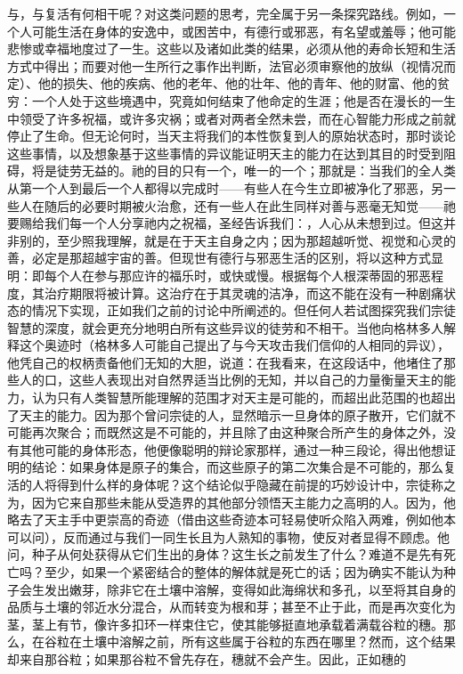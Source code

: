与，与复活有何相干呢？对这类问题的思考，完全属于另一条探究路线。例如，一个人可能生活在身体的安逸中，或困苦中，有德行或邪恶，有名望或羞辱；他可能悲惨或幸福地度过了一生。这些以及诸如此类的结果，必须从他的寿命长短和生活方式中得出；而要对他一生所行之事作出判断，法官必须审察他的放纵（视情况而定）、他的损失、他的疾病、他的老年、他的壮年、他的青年、他的财富、他的贫穷：一个人处于这些境遇中，究竟如何结束了他命定的生涯；他是否在漫长的一生中领受了许多祝福，或许多灾祸；或者对两者全然未尝，而在心智能力形成之前就停止了生命。但无论何时，当天主将我们的本性恢复到人的原始状态时，那时谈论这些事情，以及想象基于这些事情的异议能证明天主的能力在达到其目的时受到阻碍，将是徒劳无益的。祂的目的只有一个，唯一的一个；那就是：当我们的全人类从第一个人到最后一个人都得以完成时——有些人在今生立即被净化了邪恶，另一些人在随后的必要时期被火治愈，还有一些人在此生同样对善与恶毫无知觉——祂要赐给我们每一个人分享祂内之祝福，圣经告诉我们：，人心从未想到过。但这并非别的，至少照我理解，就是在于天主自身之内；因为那超越听觉、视觉和心灵的善，必定是那超越宇宙的善。但现世有德行与邪恶生活的区别，将以这种方式显明：即每个人在参与那应许的福乐时，或快或慢。根据每个人根深蒂固的邪恶程度，其治疗期限将被计算。这治疗在于其灵魂的洁净，而这不能在没有一种剧痛状态的情况下实现，正如我们之前的讨论中所阐述的。但任何人若试图探究我们宗徒智慧的深度，就会更充分地明白所有这些异议的徒劳和不相干。当他向格林多人解释这个奥迹时（格林多人可能自己提出了与今天攻击我们信仰的人相同的异议），他凭自己的权柄责备他们无知的大胆，说道：在我看来，在这段话中，他堵住了那些人的口，这些人表现出对自然界适当比例的无知，并以自己的力量衡量天主的能力，认为只有人类智慧所能理解的范围才对天主是可能的，而超出此范围的也超出了天主的能力。因为那个曾问宗徒的人，显然暗示一旦身体的原子散开，它们就不可能再次聚合；而既然这是不可能的，并且除了由这种聚合所产生的身体之外，没有其他可能的身体形态，他便像聪明的辩论家那样，通过一种三段论，得出他想证明的结论：如果身体是原子的集合，而这些原子的第二次集合是不可能的，那么复活的人将得到什么样的身体呢？这个结论似乎隐藏在前提的巧妙设计中，宗徒称之为，因为它来自那些未能从受造界的其他部分领悟天主能力之高明的人。因为，他略去了天主手中更崇高的奇迹（借由这些奇迹本可轻易使听众陷入两难，例如他本可以问），反而通过与我们一同生长且为人熟知的事物，使反对者显得不顾虑。他问，种子从何处获得从它们生出的身体？这生长之前发生了什么？难道不是先有死亡吗？至少，如果一个紧密结合的整体的解体就是死亡的话；因为确实不能认为种子会生发出嫩芽，除非它在土壤中溶解，变得如此海绵状和多孔，以至将其自身的品质与土壤的邻近水分混合，从而转变为根和芽；甚至不止于此，而是再次变化为茎，茎上有节，像许多扣环一样束住它，使其能够挺直地承载着满载谷粒的穗。那么，在谷粒在土壤中溶解之前，所有这些属于谷粒的东西在哪里？然而，这个结果却来自那谷粒；如果那谷粒不曾先存在，穗就不会产生。因此，正如穗的\Q